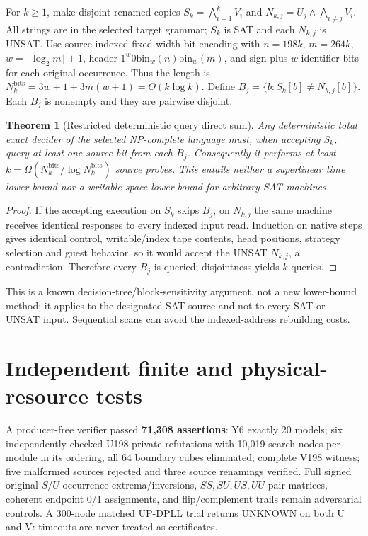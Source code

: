 \documentclass[11pt]{article}
\newtheorem{theorem}{Theorem}
\begin{document}
For $k\ge1$, make disjoint renamed copies
$S_k=\bigwedge_{i=1}^k V_i$ and
$N_{k,j}=U_j\wedge\bigwedge_{i\ne j}V_i$.
All strings are in the selected target grammar; $S_k$ is SAT and
each $N_{k,j}$ is UNSAT. Use source-indexed fixed-width bit encoding with
$n=198k$, $m=264k$, $w=\lfloor\log_2m\rfloor+1$, header
$1^w0\mathrm{bin}_w(n)\mathrm{bin}_w(m)$, and sign plus $w$
identifier bits for each original occurrence. Thus the length is
$N_k^{\mathrm{bits}}=3w+1+3m(w+1)=\Theta(k\log k)$.
Define $B_j=\{b:S_k[b]\ne N_{k,j}[b]\}$. Each $B_j$ is nonempty
and they are pairwise disjoint.
\begin{theorem}[Restricted deterministic query direct sum]
Any deterministic total exact decider of the selected NP-complete
language must, when accepting $S_k$, query at least one source bit
from each $B_j$. Consequently it performs at least
$k=\Omega(N_k^{\mathrm{bits}}/\log N_k^{\mathrm{bits}})$
source probes. This entails neither a superlinear time lower bound
nor a writable-space lower bound for arbitrary SAT machines.
\end{theorem}
\begin{proof}
If the accepting execution on $S_k$ skips $B_j$, on $N_{k,j}$
the same machine receives identical responses to every indexed input
read. Induction on native steps gives identical control, writable/index
tape contents, head positions, strategy selection and guest behavior,
so it would accept the UNSAT $N_{k,j}$, a contradiction.
Therefore every $B_j$ is queried; disjointness yields $k$ queries.
\end{proof}
This is a known decision-tree/block-sensitivity argument, not
a new lower-bound method; it applies to the designated SAT source
and not to every SAT or UNSAT input. Sequential scans can avoid
the indexed-address rebuilding costs.

\section{Independent finite and physical-resource tests}
A producer-free verifier passed \textbf{71,308 assertions}:
Y6 exactly 20 models; six independently checked U198 private
refutations with 10,019 search nodes per module in its ordering,
all 64 boundary cubes eliminated; complete V198 witness;
five malformed sources rejected and three source renamings verified.
Full signed original $S/U$ occurrence extrema/inversions,
$SS,SU,US,UU$ pair matrices, coherent endpoint 0/1 assignments,
and flip/complement trails remain adversarial controls.
A 300-node matched UP-DPLL trial returns UNKNOWN on both U and V:
timeouts are never treated as certificates.
\end{document}
